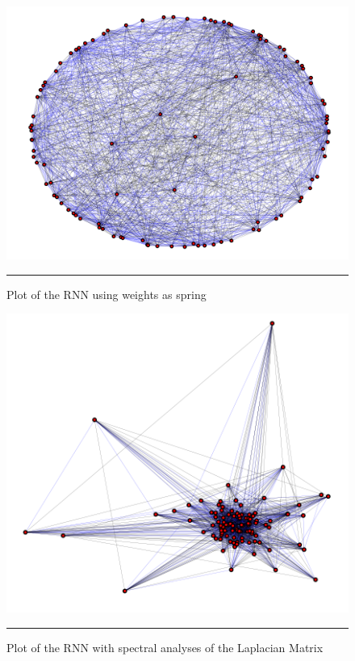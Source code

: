 \begin{figure}[htbp]
    \centering
    \includegraphics[scale=0.8]{Figures/weighted_graph_spring.png}
    \rule{35em}{0.5pt}
    \caption[Plot of the RNN using weights as springs]{Plot of the RNN using weights as spring}
    \label{fig:ring_lattice}
\end{figure}


\begin{figure}[htbp]
    \centering
    \includegraphics[scale=0.8]{Figures/weighted_graph_spectral.png}
    \rule{35em}{0.5pt}
    \caption[Plot of the RNN with spectral analyses of the Laplacian Matrix ]{Plot of the RNN with spectral analyses of the Laplacian Matrix}
    \label{fig:ring_lattice}
\end{figure}

